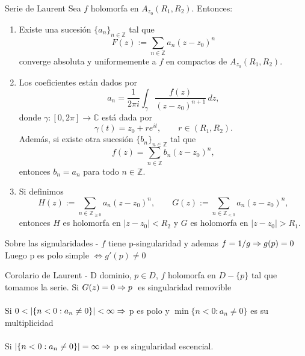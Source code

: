 \begin{Theorem}{Serie de Laurent}
 Sea $f$ holomorfa en $A_{z_0}(R_1,R_2)$. Entonces:

    \begin{enumerate}
        \item Existe una sucesión $\{a_n\}_{n\in\mathbb{Z}}$ tal que
        \[
            F(z):=\sum_{n\in\mathbb{Z}} a_n (z-z_0)^n
        \]
        converge absoluta y uniformemente a $f$ en compactos de $A_{z_0}(R_1,R_2)$.

        \item Los coeficientes están dados por
        \[
            a_n=\frac{1}{2\pi i}\int_\gamma \frac{f(z)}{(z-z_0)^{n+1}}\,dz,
        \]
        donde $\gamma:[0,2\pi]\to\mathbb{C}$ está dada por
        \[
            \gamma(t)=z_0+re^{it}, \qquad r\in(R_1,R_2).
        \]
        Además, si existe otra sucesión $\{b_n\}_{n\in\mathbb{Z}}$ tal que
        \[
            f(z)=\sum_{n\in\mathbb{Z}} b_n (z-z_0)^n,
        \]
        entonces $b_n=a_n$ para todo $n\in\mathbb{Z}$.

        \item Si definimos
        \[
            H(z):=\sum_{n\in\mathbb{Z}_{\ge 0}} a_n (z-z_0)^n,
            \qquad
            G(z):=\sum_{n\in\mathbb{Z}_{<0}} a_n (z-z_0)^n,
        \]
        entonces $H$ es holomorfa en $|z-z_0|<R_2$ y $G$ es holomorfa en $|z-z_0|>R_1$.
    \end{enumerate}
\end{Theorem}

\begin{Proposition}{Sobre las signularidades}
    - $f$ tiene p-singularidad y ademas $f = 1/g \Rightarrow g(p) = 0 $
    Luego p es polo simple $ \iff g'(p) \neq 0 $
\end{Proposition}

\begin{Corollary}{Corolario de Laurent}
    - D dominio, $p \in D$, $f$ holomorfa en $D - \{ p \}$ tal que 
    tomamos la serie. Si $ G(z) = 0 \Rightarrow p \;$ es singularidad removible
    \\
    \\
    Si $ 0 < | \{  n < 0 : a_n \neq 0 \} | < \infty \Rightarrow $ p es polo y $\min  \{  n < 0 : a_n \neq 0 \} $ es su multiplicidad 
    \\
    \\
    Si $| \{  n < 0 : a_n \neq 0 \} | = \infty \Rightarrow $ p es singularidad escencial.

\end{Corollary}